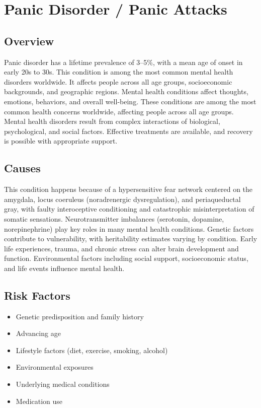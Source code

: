 \chapter{Panic Disorder / Panic Attacks}
\label{sec:Panic Disorder / Panic Attacks}

\section{Overview}
Panic disorder has a lifetime prevalence of 3--5\%, with a mean age of onset in early 20s to 30s. This condition is among the most common mental health disorders worldwide. It affects people across all age groups, socioeconomic backgrounds, and geographic regions. Mental health conditions affect thoughts, emotions, behaviors, and overall well-being. These conditions are among the most common health concerns worldwide, affecting people across all age groups. Mental health disorders result from complex interactions of biological, psychological, and social factors. Effective treatments are available, and recovery is possible with appropriate support.
\section{Causes}
This condition happens because of a hypersensitive fear network centered on the amygdala, locus coeruleus (noradrenergic dysregulation), and periaqueductal gray, with faulty interoceptive conditioning and catastrophic misinterpretation of somatic sensations.  Neurotransmitter imbalances (serotonin, dopamine, norepinephrine) play key roles in many mental health conditions. Genetic factors contribute to vulnerability, with heritability estimates varying by condition. Early life experiences, trauma, and chronic stress can alter brain development and function. Environmental factors including social support, socioeconomic status, and life events influence mental health.   
\section{Risk Factors}
\begin{itemize}[noitemsep]
  \item Genetic predisposition and family history
  \item Advancing age
  \item Lifestyle factors (diet, exercise, smoking, alcohol)
  \item Environmental exposures
  \item Underlying medical conditions
  \item Medication use
\end{itemize}
